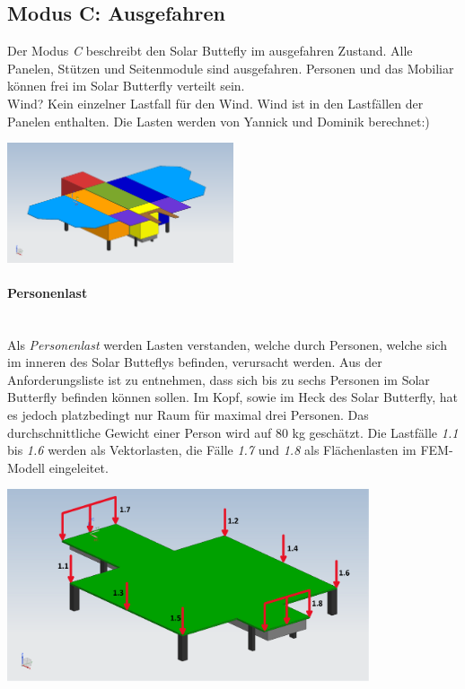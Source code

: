 \subsection{Modus C: Ausgefahren}
Der Modus \emph{C} beschreibt den Solar Buttefly im ausgefahren Zustand. Alle Panelen, Stützen und Seitenmodule sind ausgefahren. Personen und das Mobiliar können frei im Solar Butterfly verteilt sein.\\

Wind?
Kein einzelner Lastfall für den Wind. Wind ist in den Lastfällen der Panelen enthalten. Die Lasten werden von Yannick und Dominik berechnet:)\\

\begin{center}
  \includegraphics[width=0.5\textwidth]{04_Figures/C.png}
  \label{Modus C}
\end{center}

\paragraph{Personenlast}\mbox{}\\
Als \emph{Personenlast} werden Lasten verstanden, welche durch Personen, welche sich im inneren des Solar Butteflys befinden, verursacht werden. Aus der Anforderungsliste ist zu entnehmen, dass sich bis zu sechs Personen im Solar Butterfly befinden können sollen. Im Kopf, sowie im Heck des Solar Butterfly, hat es jedoch platzbedingt nur Raum für maximal drei Personen. Das durchschnittliche Gewicht einer Person wird auf 80 kg geschätzt. Die Lastfälle \emph{1.1} bis \emph{1.6} werden als Vektorlasten, die Fälle \emph{1.7} und \emph{1.8} als Flächenlasten im FEM-Modell eingeleitet.

\begin{center}
  \includegraphics[width=0.8\textwidth]{04_Figures/BodenMitLasten.png}
  \label{Boden}
\end{center}

